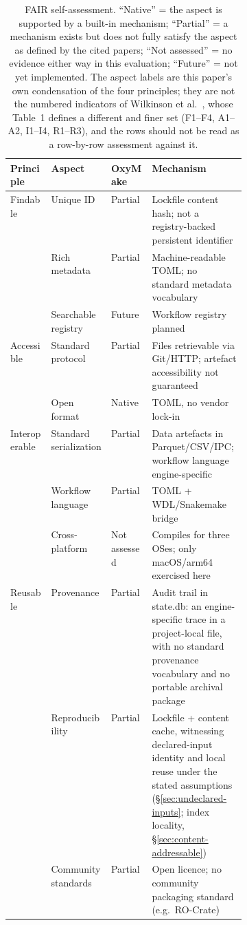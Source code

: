 \documentclass[12pt,a4paper]{article}
\begin{document}
\begin{table}[htbp]
\centering\footnotesize\setlength{\tabcolsep}{4pt}
\begin{tabular}{@{}lllp{0.40\linewidth}@{}}
\toprule
\textbf{Principle} & \textbf{Aspect} & \textbf{OxyMake} & \textbf{Mechanism} \\
\midrule
\multirow{3}{*}{Findable}
  & Unique ID        & Partial & Lockfile content hash; not a registry-backed persistent identifier \\
  & Rich metadata    & Partial & Machine-readable TOML; no standard metadata vocabulary \\
  & Searchable registry & Future & Workflow registry planned \\
\midrule
\multirow{2}{*}{Accessible}
  & Standard protocol & Partial & Files retrievable via Git/HTTP; artefact accessibility not guaranteed \\
  & Open format       & Native & TOML, no vendor lock-in \\
\midrule
\multirow{3}{*}{Interoperable}
  & Standard serialization & Partial & Data artefacts in Parquet/CSV/IPC; workflow language engine-specific \\
  & Workflow language       & Partial & TOML + WDL/Snakemake bridge \\
  & Cross-platform          & Not assessed & Compiles for three OSes; only macOS/arm64 exercised here \\
\midrule
\multirow{3}{*}{Reusable}
  & Provenance        & Partial & Audit trail in state.db: an engine-specific trace in a project-local file, with no standard provenance vocabulary and no portable archival package \\
  & Reproducibility   & Partial & Lockfile + content cache, witnessing declared-input identity and local reuse under the stated assumptions (\S\ref{sec:undeclared-inputs}; index locality, \S\ref{sec:content-addressable}) \\
  & Community standards & Partial & Open licence; no community packaging standard (e.g.\ RO-Crate) \\
\bottomrule
\end{tabular}
\caption{FAIR self-assessment. ``Native'' = the aspect is supported by
  a built-in mechanism; ``Partial'' = a mechanism exists but does not
  fully satisfy the aspect as defined by the cited papers;
  ``Not assessed'' = no evidence either way in this evaluation;
  ``Future'' = not yet implemented. The aspect labels are this paper's
  own condensation of the four principles; they are not the numbered
  indicators of Wilkinson et al.~\cite{wilkinsonApplyingFAIRPrinciples2025},
  whose Table~1 defines a different and finer set (F1--F4, A1--A2,
  I1--I4, R1--R3), and the rows should not be read as a row-by-row
  assessment against it.}
\label{tab:fair}
\end{table}
\end{document}
